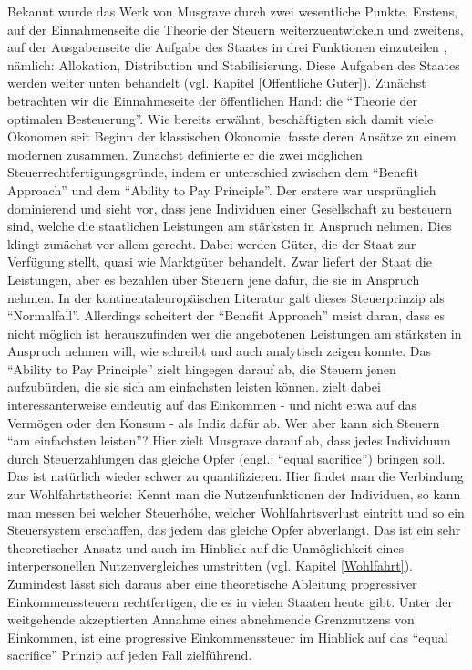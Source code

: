 Bekannt wurde das Werk von Musgrave durch zwei wesentliche Punkte. Erstens, auf der Einnahmenseite die Theorie der Steuern weiterzuentwickeln \parencite{Musgrave1959} und zweitens, auf der Ausgabenseite die Aufgabe des Staates in drei Funktionen einzuteilen \parencite{Musgrave1956, Musgrave1959}, nämlich: Allokation, Distribution und Stabilisierung. Diese Aufgaben des Staates werden weiter unten behandelt (vgl. Kapitel \ref{Offentliche Guter}). Zunächst betrachten wir die Einnahmeseite der öffentlichen Hand: die "`Theorie der optimalen Besteuerung"'. Wie bereits erwähnt, beschäftigten sich damit viele Ökonomen seit Beginn der klassischen Ökonomie. \textcite{Musgrave1959} fasste deren Ansätze zu einem modernen zusammen. Zunächst definierte er die zwei möglichen Steuerrechtfertigungsgründe, indem er unterschied zwischen dem "`Benefit Approach"' und dem "`Ability to Pay Principle"'. Der erstere war ursprünglich dominierend und sieht vor, dass jene Individuen einer Gesellschaft zu besteuern sind, welche die staatlichen Leistungen am stärksten in Anspruch nehmen. Dies klingt zunächst vor allem gerecht. Dabei werden Güter, die der Staat zur Verfügung stellt, quasi wie Marktgüter behandelt. Zwar liefert der Staat die Leistungen, aber es bezahlen über Steuern jene dafür, die sie in Anspruch nehmen. In der kontinentaleuropäischen Literatur galt dieses Steuerprinzip als "`Normalfall"'. Allerdings scheitert der "`Benefit Approach"' meist daran, dass es nicht möglich ist herauszufinden wer die angebotenen Leistungen am stärksten in Anspruch nehmen will, wie \textcite{Musgrave1959} schreibt und \textcite{Samuelson1954} auch analytisch zeigen konnte. Das "`Ability to Pay Principle"' zielt hingegen darauf ab, die Steuern jenen aufzubürden, die sie sich am einfachsten leisten können. \textcite{Musgrave1959} zielt dabei interessanterweise eindeutig auf das Einkommen - und nicht etwa auf das Vermögen oder den Konsum - als Indiz dafür ab. Wer aber kann sich Steuern "`am einfachsten leisten"'? Hier zielt Musgrave darauf ab, dass jedes Individuum durch Steuerzahlungen das gleiche Opfer (engl.: "`equal sacrifice"') bringen soll. Das ist natürlich wieder schwer zu quantifizieren. Hier findet man die Verbindung zur Wohlfahrtstheorie: Kennt man die Nutzenfunktionen der Individuen, so kann man messen bei welcher Steuerhöhe, welcher Wohlfahrtsverlust eintritt und so ein Steuersystem erschaffen, das jedem das gleiche Opfer abverlangt. Das ist ein sehr theoretischer Ansatz und auch im Hinblick auf die Unmöglichkeit eines interpersonellen Nutzenvergleiches umstritten (vgl. Kapitel \ref{Wohlfahrt}). Zumindest lässt sich daraus aber eine theoretische Ableitung progressiver Einkommenssteuern rechtfertigen, die es in vielen Staaten heute gibt. Unter der weitgehende akzeptierten Annahme eines abnehmende Grenznutzens von Einkommen, ist eine progressive Einkommenssteuer im Hinblick auf das "`equal sacrifice"' Prinzip auf jeden Fall zielführend.  

